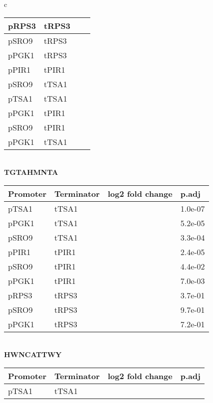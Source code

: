 \documentclass[../main.tex]{subfiles}
\begin{document}
\begin{table}[ph!]
{\begin{tabular}{c}
\begin{tabularx}{0.8\textwidth} { 
  | >{\centering\arraybackslash}X 
  | >{\centering\arraybackslash}X  
  | >{\centering\arraybackslash}X
  | >{\centering\arraybackslash}X | }
\hline
pRPS3 & tRPS3 & -0.4656481 & 0.0015\\
\hline
pSRO9 & tRPS3 & -0.3685185 & 0.0210\\
\hline
pPGK1 & tRPS3 & -0.1268519 & 0.3900\\
\hline
pPIR1 & tPIR1 & -0.0872287 & 0.2800\\
\hline
pSRO9 & tTSA1 & -0.0170833 & 0.9100\\
\hline
pTSA1 & tTSA1 & 0.0669444 & 0.6700\\
\hline
pPGK1 & tPIR1 & 0.0843282 & 0.1900\\
\hline
pSRO9 & tPIR1 & 0.1539836 & 0.0760\\
\hline
pPGK1 & tTSA1 & 0.3288889 & 0.0200\\
\hline
\end{tabularx} \\
\textbf{TGTAHMNTA} \\
\begin{tabularx}{0.8\textwidth} { 
  | >{\centering\arraybackslash}X 
  | >{\centering\arraybackslash}X  
  | >{\centering\arraybackslash}X
  | >{\centering\arraybackslash}X | }
\hline
\textbf{Promoter} & \textbf{Terminator} & \textbf{log2 fold change} & \textbf{p.adj}\\
\hline
pTSA1 & tTSA1 & -1.2986111 & 1.0e-07\\
\hline
pPGK1 & tTSA1 & -0.8977778 & 5.2e-05\\
\hline
pSRO9 & tTSA1 & -0.7969444 & 3.3e-04\\
\hline
pPIR1 & tPIR1 & -0.7679716 & 2.4e-05\\
\hline
pSRO9 & tPIR1 & -0.3607687 & 4.4e-02\\
\hline
pPGK1 & tPIR1 & -0.3570995 & 7.0e-03\\
\hline
pRPS3 & tRPS3 & -0.1788889 & 3.7e-01\\
\hline
pSRO9 & tRPS3 & -0.0075926 & 9.7e-01\\
\hline
pPGK1 & tRPS3 & 0.0798148 & 7.2e-01\\
\hline
\end{tabularx} \\
\textbf{HWNCATTWY} \\
\begin{tabularx}{0.8\textwidth} { 
  | >{\centering\arraybackslash}X 
  | >{\centering\arraybackslash}X  
  | >{\centering\arraybackslash}X
  | >{\centering\arraybackslash}X | }
\hline
\textbf{Promoter} & \textbf{Terminator} & \textbf{log2 fold change} & \textbf{p.adj}\\
\hline
pTSA1 & tTSA1 & -0.3393056 & 0.0013\\

\end{tabularx}
\end{tabular}}
\end{table}
\end{document}
